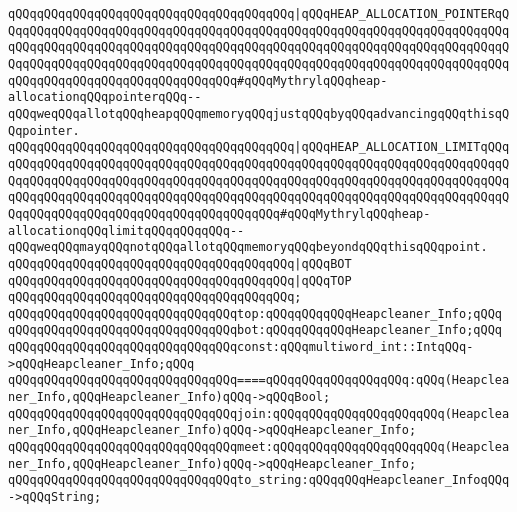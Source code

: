 \verb|qQQqqQQqqQQqqQQqqQQqqQQqqQQqqQQqqQQqqQQq|\verb#|qQQqHEAP_ALLOCATION_POINTERqQQqqQQqqQQqqQQqqQQqqQQqqQQqqQQqqQQqqQQqqQQqqQQqqQQqqQQqqQQqqQQqqQQqqQQqqQQqqQQqqQQqqQQqqQQqqQQqqQQqqQQqqQQqqQQqqQQqqQQqqQQqqQQqqQQqqQQqqQQqqQQqqQQqqQQqqQQqqQQqqQQqqQQqqQQqqQQqqQQqqQQqqQQqqQQqqQQqqQQqqQQqqQQqqQQqqQQqqQQqqQQqqQQqqQQqqQQqqQQqqQQq#\verb|#qQQqMythrylqQQqheap-allocationqQQqpointerqQQq--qQQqweqQQqallotqQQqheapqQQqmemoryqQQqjustqQQqbyqQQqadvancingqQQqthisqQQqpointer.|\newline
\verb|qQQqqQQqqQQqqQQqqQQqqQQqqQQqqQQqqQQqqQQq|\verb#|qQQqHEAP_ALLOCATION_LIMITqQQqqQQqqQQqqQQqqQQqqQQqqQQqqQQqqQQqqQQqqQQqqQQqqQQqqQQqqQQqqQQqqQQqqQQqqQQqqQQqqQQqqQQqqQQqqQQqqQQqqQQqqQQqqQQqqQQqqQQqqQQqqQQqqQQqqQQqqQQqqQQqqQQqqQQqqQQqqQQqqQQqqQQqqQQqqQQqqQQqqQQqqQQqqQQqqQQqqQQqqQQqqQQqqQQqqQQqqQQqqQQqqQQqqQQqqQQqqQQqqQQqqQQqqQQq#\verb|#qQQqMythrylqQQqheap-allocationqQQqlimitqQQqqQQqqQQq--qQQqweqQQqmayqQQqnotqQQqallotqQQqmemoryqQQqbeyondqQQqthisqQQqpoint.|\newline
\verb|qQQqqQQqqQQqqQQqqQQqqQQqqQQqqQQqqQQqqQQq|\verb#|qQQqBOT#\newline
\verb|qQQqqQQqqQQqqQQqqQQqqQQqqQQqqQQqqQQqqQQq|\verb#|qQQqTOP#\newline
\verb|qQQqqQQqqQQqqQQqqQQqqQQqqQQqqQQqqQQqqQQq;|\newline
\newline
\verb|qQQqqQQqqQQqqQQqqQQqqQQqqQQqqQQqtop:qQQqqQQqqQQqHeapcleaner_Info;qQQq|\newline
\verb|qQQqqQQqqQQqqQQqqQQqqQQqqQQqqQQqbot:qQQqqQQqqQQqHeapcleaner_Info;qQQq|\newline
\verb|qQQqqQQqqQQqqQQqqQQqqQQqqQQqqQQqconst:qQQqmultiword_int::IntqQQq->qQQqHeapcleaner_Info;qQQq|\newline
\newline
\verb|qQQqqQQqqQQqqQQqqQQqqQQqqQQqqQQq====qQQqqQQqqQQqqQQqqQQq:qQQq(Heapcleaner_Info,qQQqHeapcleaner_Info)qQQq->qQQqBool;|\newline
\verb|qQQqqQQqqQQqqQQqqQQqqQQqqQQqqQQqjoin:qQQqqQQqqQQqqQQqqQQqqQQq(Heapcleaner_Info,qQQqHeapcleaner_Info)qQQq->qQQqHeapcleaner_Info;|\newline
\verb|qQQqqQQqqQQqqQQqqQQqqQQqqQQqqQQqmeet:qQQqqQQqqQQqqQQqqQQqqQQq(Heapcleaner_Info,qQQqHeapcleaner_Info)qQQq->qQQqHeapcleaner_Info;|\newline
\newline
\verb|qQQqqQQqqQQqqQQqqQQqqQQqqQQqqQQqto_string:qQQqqQQqHeapcleaner_InfoqQQq->qQQqString;|\newline
\newline
